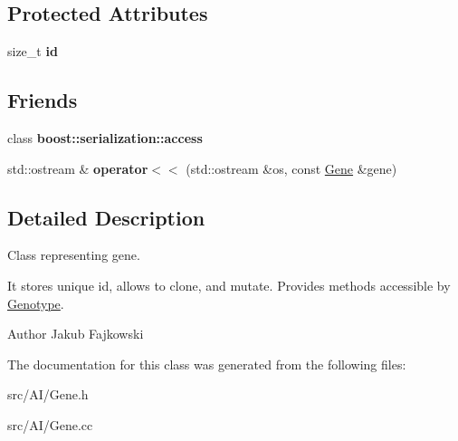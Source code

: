 \subsection*{Protected Attributes}
\begin{DoxyCompactItemize}
\item 
size\+\_\+t {\bfseries id}\hypertarget{classGene_acdea063f669e84f754cf884f388c818a}{}\label{classGene_acdea063f669e84f754cf884f388c818a}

\end{DoxyCompactItemize}
\subsection*{Friends}
\begin{DoxyCompactItemize}
\item 
class {\bfseries boost\+::serialization\+::access}\hypertarget{classGene_ac98d07dd8f7b70e16ccb9a01abf56b9c}{}\label{classGene_ac98d07dd8f7b70e16ccb9a01abf56b9c}

\item 
std\+::ostream \& {\bfseries operator$<$$<$} (std\+::ostream \&os, const \hyperlink{classGene}{Gene} \&gene)\hypertarget{classGene_a7e61f216b89ac41b4cfc8af4184abd79}{}\label{classGene_a7e61f216b89ac41b4cfc8af4184abd79}

\end{DoxyCompactItemize}


\subsection{Detailed Description}
Class representing gene. 

It stores unique id, allows to clone, and mutate. Provides methods accessible by \hyperlink{classGenotype}{Genotype}. \begin{DoxyAuthor}{Author}
Jakub Fajkowski 
\end{DoxyAuthor}


The documentation for this class was generated from the following files\+:\begin{DoxyCompactItemize}
\item 
src/\+A\+I/Gene.\+h\item 
src/\+A\+I/Gene.\+cc\end{DoxyCompactItemize}
